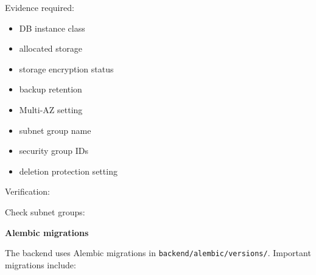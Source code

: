 Evidence required:

\begin{itemize}
\tightlist
\item
  DB instance class
\item
  allocated storage
\item
  storage encryption status
\item
  backup retention
\item
  Multi-AZ setting
\item
  subnet group name
\item
  security group IDs
\item
  deletion protection setting
\end{itemize}

Verification:

\begin{Shaded}
\begin{Highlighting}[]
\DataTypeTok{\textbackslash{}}
  \DataTypeTok{\textbackslash{}}
\end{Highlighting}
\end{Shaded}

Check subnet groups:

\begin{Shaded}
\begin{Highlighting}[]
\end{Highlighting}
\end{Shaded}

\vspace{0.5em}\noindent\textbf{Alembic migrations}\par

The backend uses Alembic migrations in
\texttt{backend/\allowbreak{}alembic/\allowbreak{}versions/\allowbreak{}}. Important migrations include:

